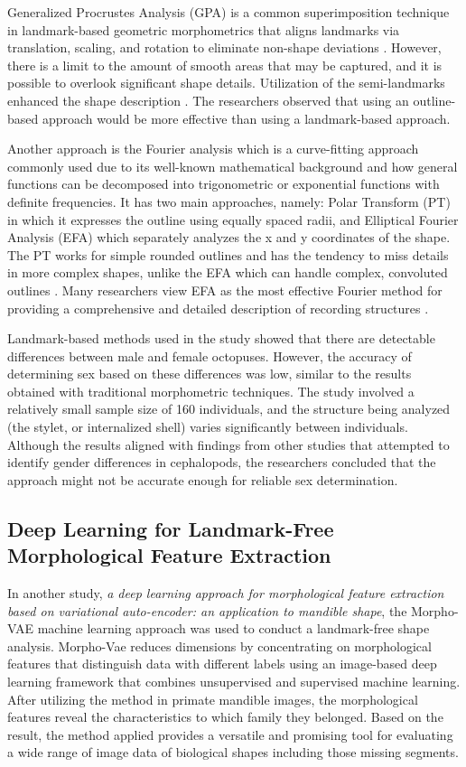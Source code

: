 Generalized Procrustes Analysis (GPA) is a common superimposition technique in landmark-based geometric morphometrics that aligns landmarks via translation, scaling, and rotation to eliminate non-shape deviations \cite{zelditch2004}. However, there is a limit to the amount of smooth areas that may be captured, and it is possible to overlook significant shape details. Utilization of the semi-landmarks enhanced the shape description \cite{adams2004}. The researchers observed that using an outline-based approach would be more effective than using a landmark-based approach.

Another approach is the Fourier analysis which is a curve-fitting approach commonly used due to its well-known mathematical background and how general functions can be decomposed into trigonometric or exponential functions with definite frequencies. It has two main approaches, namely: Polar Transform (PT) in which it expresses the outline using equally spaced radii, and Elliptical Fourier Analysis (EFA) which separately analyzes the x and y coordinates of the shape. The PT works for simple rounded outlines and has the tendency to miss details in more complex shapes, unlike the EFA which can handle complex, convoluted outlines \cite{zahn1972, doering1990, ponton2006}. Many researchers view EFA as the most effective Fourier method for providing a comprehensive and detailed description of recording structures \cite{merigot2007, ferguson2011, legua2013, mahe2016}.

Landmark-based methods used in the study showed that there are detectable differences between male and female octopuses. However, the accuracy of determining sex based on these differences was low, similar to the results obtained with traditional morphometric techniques. The study involved a relatively small sample size of 160 individuals, and the structure being analyzed (the stylet, or internalized shell) varies significantly between individuals. Although the results aligned with findings from other studies that attempted to identify gender differences in cephalopods, the researchers concluded that the approach might not be accurate enough for reliable sex determination.

\subsection{Deep Learning for Landmark-Free Morphological Feature Extraction}
In another study, \textit{a deep learning approach for morphological feature extraction based on variational auto-encoder: an application to mandible shape}, the Morpho-VAE machine learning approach was used to conduct a landmark-free shape analysis. Morpho-Vae reduces dimensions by concentrating on morphological features that distinguish data with different labels using an image-based deep learning framework that combines unsupervised and supervised machine learning. After utilizing the method in primate mandible images, the morphological features reveal the characteristics to which family they belonged. Based on the result, the method applied provides a versatile and promising tool for evaluating a wide range of image data of biological shapes including those missing segments.

